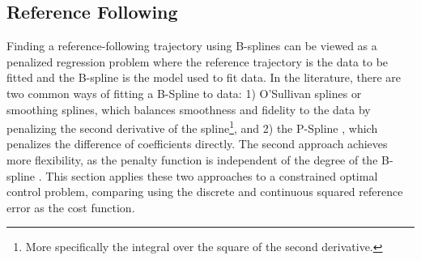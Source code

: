 \subsection{Reference Following}
\label{sec:oscillations}
Finding a reference-following trajectory using B-splines can be viewed as a penalized regression problem where the reference trajectory is the data to be fitted and the B-spline is the model used to fit data. In the literature, there are two common ways of fitting a B-Spline to data: 1) O'Sullivan splines \citep{OSullivan1986} or smoothing splines, which balances smoothness and fidelity to the data by penalizing the second derivative of the spline\footnote{More specifically the integral over the square of the second derivative.}, and 2) the P-Spline \citep{Eilers1996}, which penalizes the difference of coefficients directly. The second approach achieves more flexibility, as the penalty function is independent of the degree of the B-spline \citep{Eilers2021}. This section applies these two approaches to a constrained optimal control problem, comparing using the discrete and continuous squared reference error as the cost function. 


